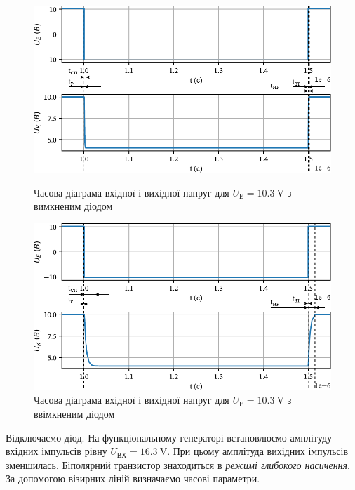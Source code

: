\documentclass[a4paper,oneside,DIV=10,12pt]{scrartcl}
\begin{document}
		\begin{figure}[p]
			\centering
			\includegraphics[width=\textwidth]{02-10p3-01-nodiode-edited.pdf}
			\caption{Часова діаграма вхідної і вихідної напруг для $U_{\text{Е}} = \SI{10,3}{\volt}$ з вимкненим діодом}
			
			\vspace*{\floatsep}
		
			\centering
			\includegraphics[width=\textwidth]{02-10p3-02-diode-edited.pdf}
			\caption{Часова діаграма вхідної і вихідної напруг для $U_{\text{Е}} = \SI{10,3}{\volt}$ з ввімкненим діодом}
		\end{figure}
		
		Відключаємо діод. На функціональному генераторі встановлюємо амплітуду вхідних імпульсів рівну $U_{\text{ВХ}} = \SI{16,3}{\volt}$. При цьому амплітуда вихідних імпульсів зменшилась. Біполярний транзистор знаходиться в \emph{режимі глибокого насичення}. За допомогою візирних ліній визначаємо часові параметри.
		
\end{document}
